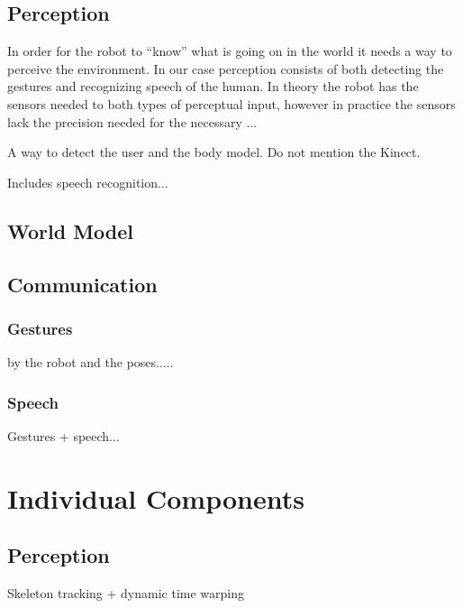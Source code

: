 \documentclass[10pt,a4paper,oneside]{scrartcl}
\begin{document}
\subsection{Perception}
In order for the robot to ``know'' what is going on in the world it needs a way to perceive the environment.
In our case perception consists of both detecting the gestures and recognizing speech of the human.
In theory the robot has the sensors needed to both types of perceptual input, however in practice the sensors lack the precision needed for the necessary ...


A way to detect the user and the body model.
Do not mention the Kinect.

Includes speech recognition...


\subsection{World Model}


\subsection{Communication}


\subsubsection{Gestures}
by the robot and the poses.....

\subsubsection{Speech}
Gestures + speech...



\section{Individual Components}

\subsection{Perception}
Skeleton tracking + dynamic time warping
\end{document}
